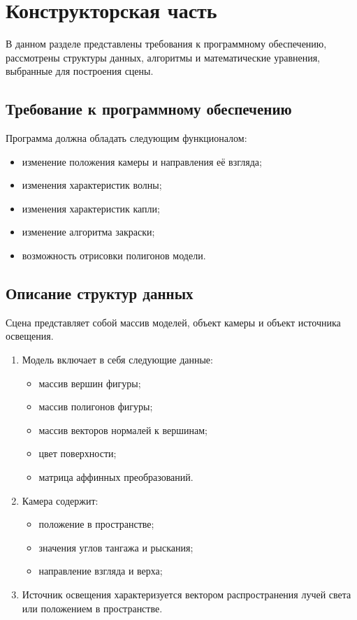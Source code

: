 \chapter{Конструкторская часть}

В данном разделе представлены требования к программному обеспечению, 
рассмотрены структуры данных, алгоритмы и математические уравнения, выбранные для построения сцены.

\section{Требование к программному обеспечению}
Программа должна обладать следующим функционалом:
\begin{itemize}[label*=---]
    \item изменение положения камеры и направления её взгляда;
    \item изменения характеристик волны;
    \item изменения характеристик капли;
    \item изменение алгоритма закраски;
    \item возможность отрисовки полигонов модели.
\end{itemize}

\section{Описание структур данных}
Сцена представляет собой массив моделей, объект камеры и объект источника освещения.
\begin{enumerate}
	\item Модель включает в себя следующие данные:
	\begin{itemize}
		\item массив вершин фигуры;
		\item массив полигонов фигуры;
		\item массив векторов нормалей к вершинам;
		\item цвет поверхности;
		\item матрица аффинных преобразований.
	\end{itemize}
	\item Камера содержит:
	\begin{itemize}
		\item положение в пространстве;
		\item значения углов тангажа и рыскания;
		\item направление взгляда и верха;
	\end{itemize}
	\item Источник освещения характеризуется вектором распространения лучей света или положением в пространстве.
\end{enumerate}

